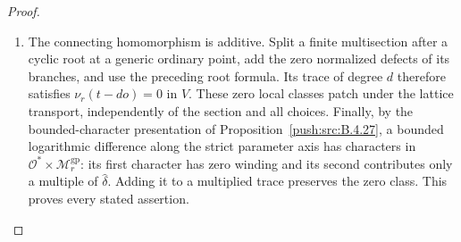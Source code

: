 \begin{proof}
\begin{enumerate}[label=\arabic*.,leftmargin=*]
\item The connecting homomorphism is additive. Split a finite multisection after a cyclic root at a generic ordinary point, add the zero normalized defects of its branches, and use the preceding root formula. Its trace of degree $d$ therefore satisfies $\nu_r(t-do)=0$ in $V$. These zero local classes patch under the lattice transport, independently of the section and all choices. Finally, by the bounded-character presentation of Proposition~\ref{push:src:B.4.27}, a bounded logarithmic difference along the strict parameter axis has characters in $\mathcal O^*\times\mathcal M_r^{\mathrm{gp}}$: its first character has zero winding and its second contributes only a multiple of $\widehat\delta$. Adding it to a multiplied trace preserves the zero class. This proves every stated assertion.
\end{enumerate}
\end{proof}